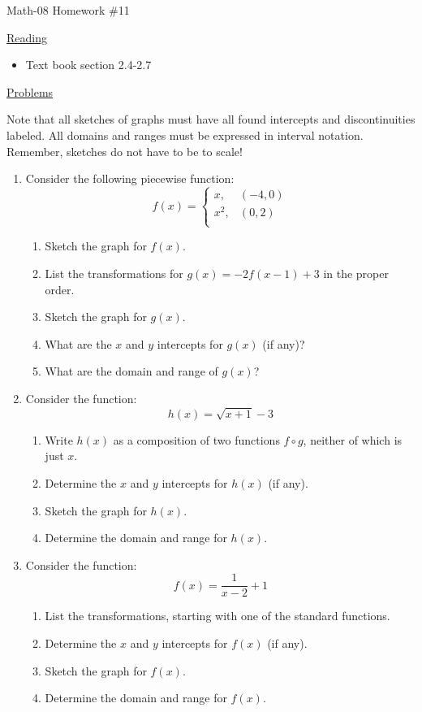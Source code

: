 \documentclass[letterpaper,12pt,fleqn]{article}
\begin{document}
\begin{center}
\Large Math-08 Homework \#11
\end{center}

\vspace{0.5in}

\underline{Reading}

\begin{itemize}
\item Text book section 2.4-2.7
\end{itemize}

\underline{Problems}

Note that all sketches of graphs must have all found intercepts and
discontinuities labeled. All domains and ranges must be expressed in
interval notation. Remember, sketches do not have to be to scale!

\begin{enumerate}
\item Consider the following piecewise function:
  \[f(x)=\begin{cases}
  x, & (-4,0) \\
  x^2, & (0,2) \\
  \end{cases}\]
  \begin{enumerate}
  \item Sketch the graph for $f(x)$.
  \item List the transformations for $g(x)=-2f(x-1)+3$ in the proper order.
  \item Sketch the graph for $g(x)$.
  \item What are the $x$ and $y$ intercepts for $g(x)$ (if any)?
  \item What are the domain and range of $g(x)$?
  \end{enumerate}

\item Consider the function:
  \[h(x)=\sqrt{x+1}-3\]
  \begin{enumerate}
  \item Write $h(x)$ as a composition of two functions $f\circ g$, neither of
    which is just $x$.
  \item Determine the $x$ and $y$ intercepts for $h(x)$ (if any).
  \item Sketch the graph for $h(x)$.
  \item Determine the domain and range for $h(x)$.
  \end{enumerate}

\item Consider the function:
  \[f(x)=\frac{1}{x-2} + 1\]
  \begin{enumerate}
  \item List the transformations, starting with one of the standard
    functions.
  \item Determine the $x$ and $y$ intercepts for $f(x)$ (if any).
  \item Sketch the graph for $f(x)$.
  \item Determine the domain and range for $f(x)$.
  \end{enumerate}


\end{enumerate}
\end{document}

